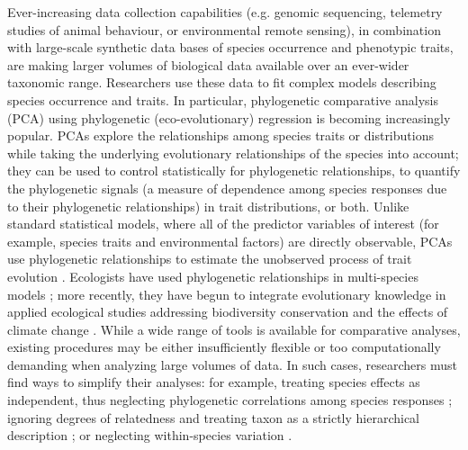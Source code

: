 \documentclass[12pt]{article}
\begin{document}
Ever-increasing data collection capabilities (e.g. genomic sequencing, telemetry studies of animal behaviour, or environmental remote sensing), in combination with large-scale synthetic data bases of species occurrence and phenotypic traits, are making larger volumes of biological data available over an ever-wider taxonomic range.
Researchers use these data to fit complex models describing species occurrence and traits.
In particular, phylogenetic comparative analysis (PCA) using phylogenetic (eco-evolutionary) regression \citep{hansen2012interpreting} is becoming increasingly popular. %
PCAs explore the relationships among species traits or distributions while taking the underlying evolutionary relationships of the species into account; they can be used to control statistically for phylogenetic relationships, to quantify the phylogenetic signals (a measure of dependence among species responses due to their phylogenetic relationships) in trait distributions, or both.
Unlike standard statistical models, where all of the predictor variables of interest (for example, species traits and environmental factors) are directly observable,  PCAs use phylogenetic relationships to estimate the unobserved process of trait evolution \citep{felsenstein1985phylogenies, butler2004phylogenetic}. 
Ecologists have used phylogenetic relationships in multi-species models \citep{garland1992procedures, freckleton2002phylogenetic, ord2010adaptation, davies2013phylogenetic}; more recently, they have begun to integrate evolutionary knowledge in applied ecological studies addressing biodiversity conservation and the effects of climate change \citep{winter2013phylogenetic, santamaria2012evolution, lankau2011incorporating, lavergne2010biodiversity, mace2008evolutionary}.
While a wide range of tools is available for comparative analyses, existing procedures may be either insufficiently flexible or too computationally demanding when analyzing large volumes of data.
In such cases, researchers must find ways to simplify their analyses: for example, treating species effects as independent, thus neglecting phylogenetic correlations among species responses \citep{bunnefeld2012island}; ignoring degrees of relatedness and treating taxon as a strictly hierarchical description \citep{tella1999habitat}; or neglecting within-species variation \citep{ord2010adaptation}.
\end{document}
